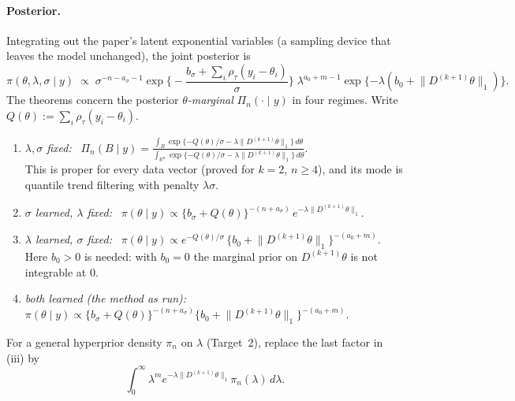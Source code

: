 \documentclass[11pt]{article}
\newcommand{\R}{\mathbb{R}}
\newcommand{\norm}[1]{\lVert #1\rVert}
\newcommand{\Dk}{D^{(k+1)}}
\newcommand{\Post}{\Pi_n}
\theoremstyle{plain}
\theoremstyle{definition}
\theoremstyle{remark}
\begin{document}
\paragraph{Posterior.} Integrating out the paper's latent exponential variables (a sampling device that leaves the model unchanged), the joint posterior is
\begin{equation}
\pi(\theta,\lambda,\sigma\mid y) \;\propto\; \sigma^{-n-a_\sigma-1}\exp\Big\{-\frac{b_\sigma+\sum_i\rho_\tau(y_i-\theta_i)}{\sigma}\Big\}\;\lambda^{a_0+m-1}\exp\{-\lambda(b_0+\norm{\Dk\theta}_1)\}.
\label{eq:joint}
\end{equation}
The theorems concern the posterior \emph{$\theta$-marginal} $\Post(\cdot\mid y)$ in four regimes. Write $Q(\theta) := \sum_{i}\rho_\tau(y_i-\theta_i)$.
\begin{enumerate}[label=(\roman*)]
\item \emph{$\lambda,\sigma$ fixed:} \ $\displaystyle \Post(B\mid y) = \frac{\int_B \exp\{-Q(\theta)/\sigma - \lambda\norm{\Dk\theta}_1\}\,d\theta}{\int_{\R^n}\exp\{-Q(\theta)/\sigma - \lambda\norm{\Dk\theta}_1\}\,d\theta}$.\\
This is proper for every data vector (proved for $k=2$, $n\ge4$), and its mode is quantile trend filtering with penalty $\lambda\sigma$.
\item \emph{$\sigma$ learned, $\lambda$ fixed:} \ $\pi(\theta\mid y)\propto \{b_\sigma+Q(\theta)\}^{-(n+a_\sigma)}\,e^{-\lambda\norm{\Dk\theta}_1}$.
\item \emph{$\lambda$ learned, $\sigma$ fixed:} \ $\pi(\theta\mid y)\propto e^{-Q(\theta)/\sigma}\,\{b_0+\norm{\Dk\theta}_1\}^{-(a_0+m)}$. Here $b_0>0$ is needed: with $b_0=0$ the marginal prior on $\Dk\theta$ is not integrable at $0$.
\item \emph{both learned (the method as run):} \ $\pi(\theta\mid y)\propto \{b_\sigma+Q(\theta)\}^{-(n+a_\sigma)}\{b_0+\norm{\Dk\theta}_1\}^{-(a_0+m)}$.
\end{enumerate}
For a general hyperprior density $\pi_n$ on $\lambda$ (Target~2), replace the last factor in (iii) by
\[
\int_0^\infty\lambda^m e^{-\lambda\norm{\Dk\theta}_1}\pi_n(\lambda)\,d\lambda .
\]
\end{document}
